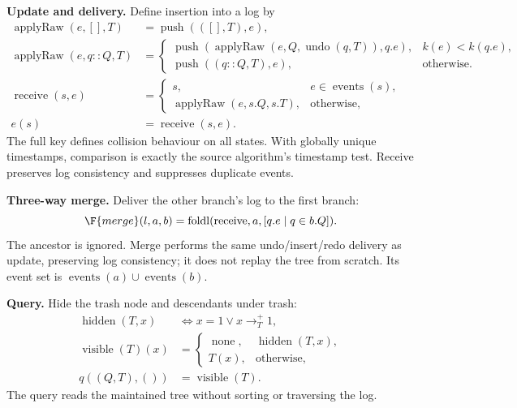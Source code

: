 \textbf{Update and delivery.} Define insertion into a log by
\[
\begin{aligned}
\operatorname{applyRaw}(e,[],T)&=\operatorname{push}(([],T),e),\\
\operatorname{applyRaw}(e,q::Q,T)&=\begin{cases}
\operatorname{push}(\operatorname{applyRaw}(e,Q,\operatorname{undo}(q,T)),q.e),
 &k(e)<k(q.e),\\
\operatorname{push}((q::Q,T),e),&\text{otherwise}.
\end{cases}\\
\operatorname{receive}(s,e)&=\begin{cases}
s,&e\in\operatorname{events}(s),\\
\operatorname{applyRaw}(e,s.Q,s.T),&\text{otherwise},
\end{cases}\\
e(s)&=\operatorname{receive}(s,e).
\end{aligned}
\]
The full key defines collision behaviour on all states. With globally unique
timestamps, comparison is exactly the source algorithm's timestamp test.
Receive preserves log consistency and suppresses duplicate events.

\textbf{Three-way merge.} Deliver the other branch's log to the first branch:
\[
\F{merge}(l,a,b)=\operatorname{foldl}
 (\operatorname{receive},a,[q.e\mid q\in b.Q]).
\]
The ancestor is ignored. Merge performs the same undo/insert/redo delivery
as update, preserving log consistency; it does not replay the tree from
scratch. Its event set is $\operatorname{events}(a)\cup\operatorname{events}(b)$.

\textbf{Query.} Hide the trash node and descendants under trash:
\[
\begin{aligned}
\operatorname{hidden}(T,x)&\iff x=1\lor x\to_T^+1,\\
\operatorname{visible}(T)(x)&=\begin{cases}
\operatorname{none},&\operatorname{hidden}(T,x),\\T(x),&\text{otherwise},
\end{cases}\\
q((Q,T),())&=\operatorname{visible}(T).
\end{aligned}
\]
The query reads the maintained tree without sorting or traversing the log.

